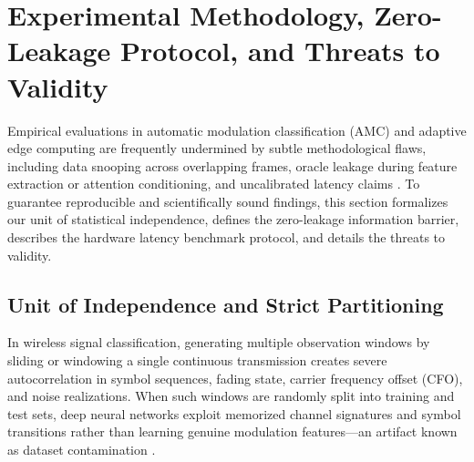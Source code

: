 \section{Experimental Methodology, Zero-Leakage Protocol, and Threats to Validity}
\label{sec:methodology_validity}

Empirical evaluations in automatic modulation classification (AMC) and adaptive edge computing are frequently undermined by subtle methodological flaws, including data snooping across overlapping frames, oracle leakage during feature extraction or attention conditioning, and uncalibrated latency claims \cite{sathyanarayanan2023rml22, wang2025survey}. To guarantee reproducible and scientifically sound findings, this section formalizes our unit of statistical independence, defines the zero-leakage information barrier, describes the hardware latency benchmark protocol, and details the threats to validity.

\subsection{Unit of Independence and Strict Partitioning}
\label{subsec:unit_independence}

In wireless signal classification, generating multiple observation windows by sliding or windowing a single continuous transmission creates severe autocorrelation in symbol sequences, fading state, carrier frequency offset (CFO), and noise realizations. When such windows are randomly split into training and test sets, deep neural networks exploit memorized channel signatures and symbol transitions rather than learning genuine modulation features---an artifact known as dataset contamination \cite{sathyanarayanan2023rml22}.

